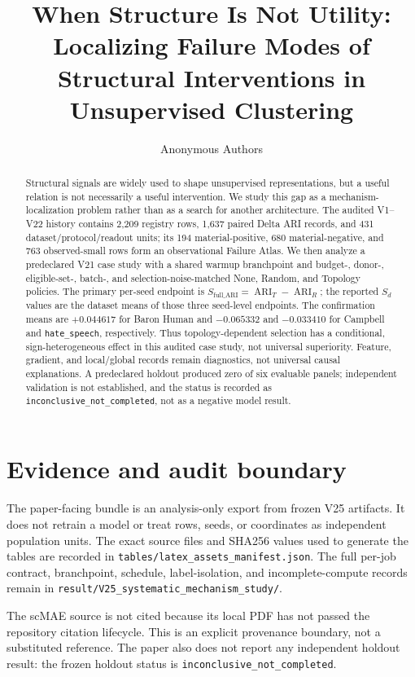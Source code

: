 \documentclass[11pt]{article}
\title{When Structure Is Not Utility: Localizing Failure Modes of Structural Interventions in Unsupervised Clustering}
\author{Anonymous Authors}
\date{}
\begin{document}
\maketitle

\begin{abstract}
Structural signals are widely used to shape unsupervised representations, but a
useful relation is not necessarily a useful intervention. We study this gap as
a mechanism-localization problem rather than as a search for another
architecture. The audited V1--V22 history contains 2,209 registry rows, 1,637
paired Delta ARI records, and 431 dataset/protocol/readout units; its 194
material-positive, 680 material-negative, and 763 observed-small rows form an
observational Failure Atlas. We then analyze a predeclared V21 case study with a
shared warmup branchpoint and budget-, donor-, eligible-set-, batch-, and
selection-noise-matched None, Random, and Topology policies. The primary
per-seed endpoint is
$S_{\mathrm{full\_ARI}}=\operatorname{ARI}_T-\operatorname{ARI}_R$; the reported
$S_d$ values are the dataset means of those three seed-level endpoints. The
confirmation means are $+0.044617$ for Baron Human and $-0.065332$ and
$-0.033410$ for Campbell and \texttt{hate\_speech}, respectively. Thus
topology-dependent selection has a conditional, sign-heterogeneous effect in
this audited case study, not universal superiority. Feature, gradient, and
local/global records remain diagnostics, not universal causal explanations. A
predeclared holdout produced zero of six evaluable panels; independent
validation is not established, and the status is recorded as
\texttt{inconclusive\_not\_completed}, not as a negative model result.
\end{abstract}







\appendix
\section{Evidence and audit boundary}
The paper-facing bundle is an analysis-only export from frozen V25 artifacts.
It does not retrain a model or treat rows, seeds, or coordinates as independent
population units. The exact source files and SHA256 values used to generate the
tables are recorded in
\texttt{tables/latex\_assets\_manifest.json}. The full per-job contract,
branchpoint, schedule, label-isolation, and incomplete-compute records remain in
\texttt{result/V25\_systematic\_mechanism\_study/}.

The scMAE source is not cited because its local PDF has not passed the repository
citation lifecycle. This is an explicit provenance boundary, not a substituted
reference. The paper also does not report any independent holdout result: the
frozen holdout status is \texttt{inconclusive\_not\_completed}.



\end{document}
